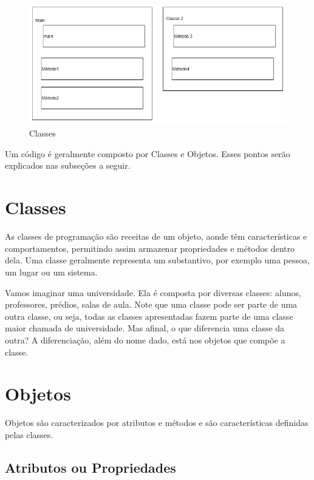 \documentclass[
]{book}
\begin{document}
\begin{figure}
\centering
\includegraphics{imagens/imagem clases.png}
\caption{Classes}
\end{figure}

Um código é geralmente composto por Classes e Objetos. Esses pontos serão explicados nas subseções a seguir.

\hypertarget{classes}{%
\section{Classes}\label{classes}}

As classes de programação são receitas de um objeto, aonde têm características e comportamentos, permitindo assim armazenar propriedades e métodos dentro dela. Uma classe geralmente representa um substantivo, por exemplo uma pessoa, um lugar ou um sistema.

Vamos imaginar uma universidade. Ela é composta por diversas classes: alunos, professores, prédios, salas de aula. Note que uma classe pode ser parte de uma outra classe, ou seja, todas as classes apresentadas fazem parte de uma classe maior chamada de universidade. Mas afinal, o que diferencia uma classe da outra? A diferenciação, além do nome dado, está nos objetos que compõe a classe.

\hypertarget{objetos}{%
\section{Objetos}\label{objetos}}

Objetos são caracterizados por atributos e métodos e são características definidas pelas classes.

\hypertarget{atributos-ou-propriedades}{%
\subsection{Atributos ou Propriedades}\label{atributos-ou-propriedades}}
\end{document}
